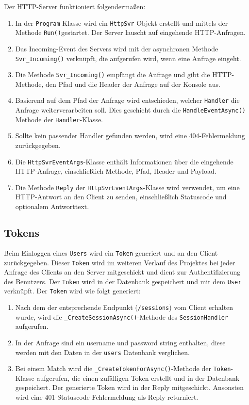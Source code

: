 \documentclass[a4paper, 12pt]{article}
\begin{document}
Der HTTP-Server funktioniert folgendermaßen:
\begin{enumerate}
    \item In der \texttt{Program}-Klasse wird ein \texttt{HttpSvr}-Objekt erstellt und mittels der Methode \texttt{Run()}gestartet. Der Server lauscht auf eingehende HTTP-Anfragen.
    \item Das Incoming-Event des Servers wird mit der asynchronen Methode \texttt{Svr\_Incoming()} verknüpft, die aufgerufen wird, wenn eine Anfrage eingeht.
    \item Die Methode \texttt{Svr\_Incoming()} empfängt die Anfrage und gibt die HTTP-Methode, den Pfad und die Header der Anfrage auf der Konsole aus.
    \item Basierend auf dem Pfad der Anfrage wird entschieden, welcher \texttt{Handler} die Anfrage weiterverarbeiten soll. Dies geschieht durch die \texttt{HandleEventAsync()} Methode der \texttt{Handler}-Klasse.
    \item Sollte kein passender Handler gefunden werden, wird eine 404-Fehlermeldung zurückgegeben.
    \item Die \texttt{HttpSvrEventArgs}-Klasse enthält Informationen über die eingehende HTTP-Anfrage, einschließlich Methode, Pfad, Header und Payload.
    \item Die Methode \texttt{Reply} der \texttt{HttpSvrEventArgs}-Klasse wird verwendet, um eine HTTP-Antwort an den Client zu senden, einschließlich Statuscode und optionalem Antworttext.
\end{enumerate}

\subsection{Tokens}
Beim Einloggen eines \texttt{Users} wird ein \texttt{Token} generiert und an den Client zurückgegeben. Dieser \texttt{Token} wird im weiteren Verlauf des Projektes bei jeder Anfrage des Clients an den Server mitgeschickt und dient zur Authentifizierung des Benutzers. Der \texttt{Token} wird in der Datenbank gespeichert und mit dem \texttt{User} verknüpft. Der \texttt{Token} wird wie folgt generiert:
\begin{enumerate}
    \item Nach dem der entsprechende Endpunkt (\texttt{/sessions}) vom Client erhalten wurde, wird die \texttt{\_CreateSessionAsync()}-Methode des \texttt{SessionHandler} aufgerufen.
    \item In der Anfrage sind ein username und password string enthalten, diese werden mit den Daten in der \texttt{users} Datenbank verglichen.
    \item Bei einem Match wird die \texttt{\_CreateTokenForAsync()}-Methode der \texttt{Token}-Klasse aufgerufen, die einen zufälligen Token erstellt und in der Datenbank gespeichert. Der generierte Token wird in der Reply mitgeschickt. Ansonsten wird eine 401-Statuscode Fehlermeldung als Reply returniert.
\end{enumerate}
\end{document}
